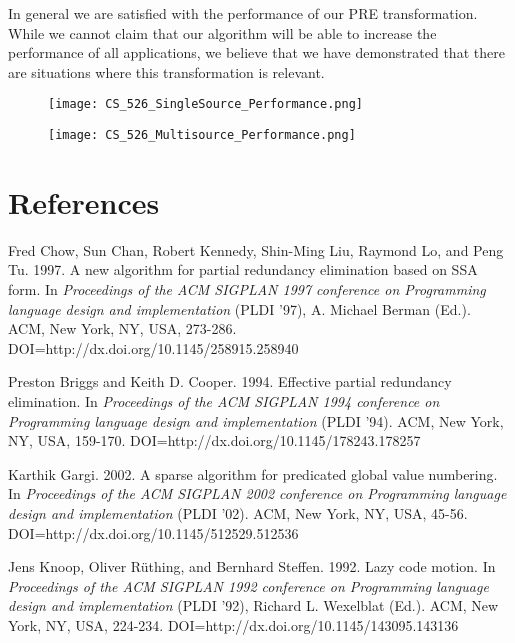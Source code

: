\documentclass[onecolumn,10pt]{journal}
\begin{document}
In general we are satisfied with the performance of our PRE transformation. While we cannot claim that our algorithm will be able to increase the performance of all applications, we believe that we have demonstrated that there are situations where this transformation is relevant. 

\begin{figure}[t] 
\centering
\texttt{[image: CS\_526\_SingleSource\_Performance.png]}
\caption{}
\end{figure}

\begin{figure}[t] 
\centering
\texttt{[image: CS\_526\_Multisource\_Performance.png]}
\caption{}
\end{figure}

\pagebreak
\section{References}

\begin{enumerate}[{[1]}]
\item Fred Chow, Sun Chan, Robert Kennedy, Shin-Ming Liu, Raymond Lo, and Peng Tu. 1997. A new algorithm for partial redundancy elimination based on SSA form. In \textit{Proceedings of the ACM SIGPLAN 1997 conference on Programming language design and implementation} (PLDI '97), A. Michael Berman (Ed.). ACM, New York, NY, USA, 273-286. DOI=http://dx.doi.org/10.1145/258915.258940

\item Preston Briggs and Keith D. Cooper. 1994. Effective partial redundancy elimination. In \textit{Proceedings of the ACM SIGPLAN 1994 conference on Programming language design and implementation} (PLDI '94). ACM, New York, NY, USA, 159-170. DOI=http://dx.doi.org/10.1145/178243.178257

\item Karthik Gargi. 2002. A sparse algorithm for predicated global value numbering. In \textit{Proceedings of the ACM SIGPLAN 2002 conference on Programming language design and implementation} (PLDI '02). ACM, New York, NY, USA, 45-56. DOI=http://dx.doi.org/10.1145/512529.512536

\item Jens Knoop, Oliver Rüthing, and Bernhard Steffen. 1992. Lazy code motion. In \textit{Proceedings of the ACM SIGPLAN 1992 conference on Programming language design and implementation} (PLDI '92), Richard L. Wexelblat (Ed.). ACM, New York, NY, USA, 224-234. DOI=http://dx.doi.org/10.1145/143095.143136
\end{enumerate}
\end{document}
